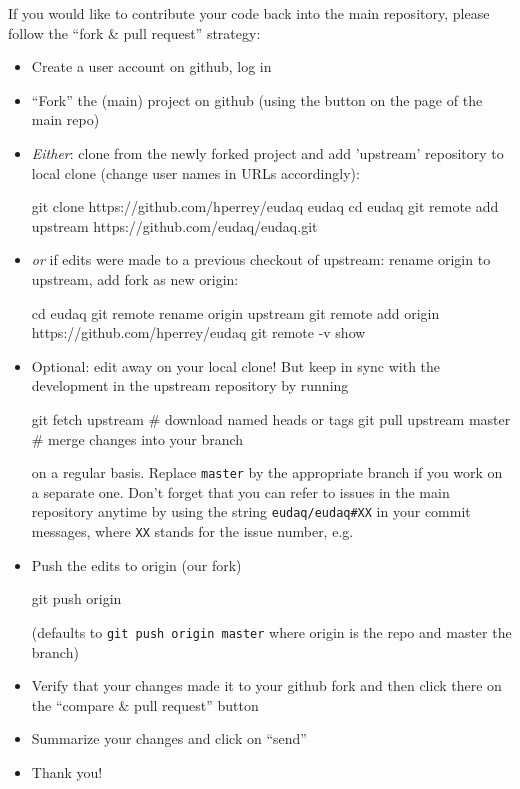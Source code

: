 If you would like to contribute your code back into the main repository, please follow the ``fork \& pull request'' strategy:

\begin{itemize}
\item Create a user account on github, log in
\item ``Fork'' the (main) project on github (using the button on the page of the main repo)
\item \emph{Either}: clone from the newly forked project and add
  'upstream' repository to local clone (change user names in URLs
  accordingly):
  \begin{listing}[mybash]
git clone https://github.com/hperrey/eudaq eudaq
cd eudaq
git remote add upstream https://github.com/eudaq/eudaq.git
\end{listing}
\item \emph{or} if edits were made to a previous checkout of upstream: rename origin to upstream, add fork as new origin:

  \begin{listing}[mybash]
cd eudaq
git remote rename origin upstream
git remote add origin https://github.com/hperrey/eudaq
git remote -v show
\end{listing}
\item Optional: edit away on your local clone! But keep in sync with
  the development in the upstream repository by running
  \begin{listing}
git fetch upstream        # download named heads or tags
git pull upstream master  # merge changes into your branch
\end{listing}
on a regular basis. Replace \texttt{master} by the appropriate branch if you work on a separate one.
Don't forget that you can refer to issues in the main repository anytime by using the string \texttt{eudaq/eudaq\#XX} in your commit messages, where \texttt{XX} stands for the issue number, e.g.
\item Push the edits to origin (our fork)
  \begin{listing}[mybash]
git push origin
\end{listing}
(defaults to \texttt{git push origin master} where origin is the repo and master the branch)
\item Verify that your changes made it to your github fork and then click there on the ``compare \& pull request'' button
\item Summarize your changes and click on ``send''
\item Thank you!
\end{itemize}
